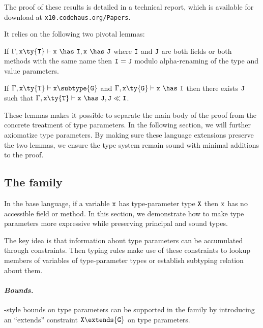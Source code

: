 The proof of these results is detailed in a technical report,
which is available for download at {\tt x10.codehaus.org/Papers}.

It relies on the following two pivotal lemmas:

\begin{lemma}
If $\Gamma,{\tt x}\ty{\tt T}\vdash{\tt x}~\has~{\tt I},{\tt x}~\has~{\tt J}$ where $\tt I$ and $\tt J$ are both fields or both methods with the same name then ${\tt I}={\tt J}$ modulo alpha-renaming of the type and value parameters.
\end{lemma}

\begin{lemma}
If $\Gamma,{\tt x}\ty{\tt T}\vdash{\tt x}\subtype{\tt G}$ and $\Gamma,{\tt x}\ty{\tt G}\vdash{\tt x}~\has~{\tt I}$ then there exists $\tt J$ such that $\Gamma,{\tt x}\ty{\tt T}\vdash{\tt x}~\has~{\tt J}, {\tt J} \ll {\tt I}$.
\end{lemma}

These lemmas makes it possible to separate the main body of the proof from the concrete treatment of type parameters. In the following section, we will further axiomatize type parameters. By making sure these language extensions preserve the two lemmas, we ensure the type system remain sound with minimal additions to the proof.

\subsection{The \FXG family}

In the base \FXG language, if a variable $\tt x$ has type-parameter type $\tt X$ then $\tt x$ has no accessible field or method. In this section, we demonstrate how to make type parameters more expressive while preserving principal and sound types.

The key idea is that information about type parameters can be accumulated through constraints. Then typing rules make use of these constraints to lookup members of variables of type-parameter types or establish subtyping relation about them.

\paragraph{\normalfont\bf\em Bounds.} \FGJ-style bounds on type parameters can be supported in the \FXG family by introducing an ``extends'' constraint \mbox{${\tt X}\extends{\tt G}$} on type parameters.

